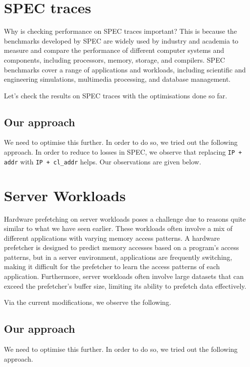 \documentclass[conference]{IEEEtran}
\begin{document}
\section{SPEC traces}
Why is checking performance on SPEC traces important? This is because the benchmarks developed by SPEC are widely used by industry and academia to measure and compare the performance of different computer systems and components, including processors, memory, storage, and compilers. SPEC benchmarks cover a range of applications and workloads, including scientific and engineering simulations, multimedia processing, and database management.

Let's check the results on SPEC traces with the optimisations done so far.




\subsection{Our approach}
We need to optimise this further. In order to do so, we tried out the following approach. In order to reduce to losses in SPEC, we observe that replacing \verb|IP + addr| with \verb|IP + cl_addr| helps. Our observations are given below.



\section{Server Workloads}
Hardware prefetching on server workloads poses a challenge due to reasons quite similar to what we have seen earlier. These workloads often involve a mix of different applications with varying memory access patterns. A hardware prefetcher is designed to predict memory accesses based on a program's access patterns, but in a server environment, applications are frequently switching, making it difficult for the prefetcher to learn the access patterns of each application. Furthermore, server workloads often involve large datasets that can exceed the prefetcher's buffer size, limiting its ability to prefetch data effectively.

Via the current modifications, we observe the following.


\subsection{Our approach}
We need to optimise this further. In order to do so, we tried out the following approach. 
\end{document}
